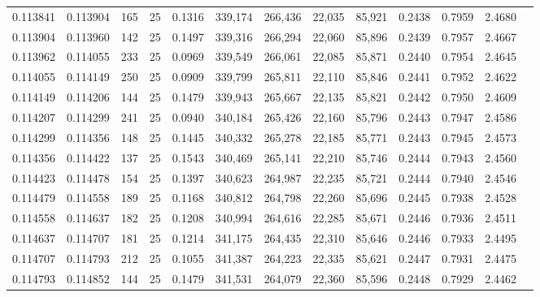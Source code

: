 \begin{tabular}{rrrrrrrrrrrrr}
0.113841 & 0.113904 &   165 &  25 &                                     0.1316 & 339,174 & 266,436 &  22,035 &  85,921 & 0.2438 & 0.7959 & 2.4680 \\
0.113904 & 0.113960 &   142 &  25 &                                     0.1497 & 339,316 & 266,294 &  22,060 &  85,896 & 0.2439 & 0.7957 & 2.4667 \\
0.113962 & 0.114055 &   233 &  25 &                                     0.0969 & 339,549 & 266,061 &  22,085 &  85,871 & 0.2440 & 0.7954 & 2.4645 \\
0.114055 & 0.114149 &   250 &  25 &                                     0.0909 & 339,799 & 265,811 &  22,110 &  85,846 & 0.2441 & 0.7952 & 2.4622 \\
0.114149 & 0.114206 &   144 &  25 &                                     0.1479 & 339,943 & 265,667 &  22,135 &  85,821 & 0.2442 & 0.7950 & 2.4609 \\
0.114207 & 0.114299 &   241 &  25 &                                     0.0940 & 340,184 & 265,426 &  22,160 &  85,796 & 0.2443 & 0.7947 & 2.4586 \\
0.114299 & 0.114356 &   148 &  25 &                                     0.1445 & 340,332 & 265,278 &  22,185 &  85,771 & 0.2443 & 0.7945 & 2.4573 \\
0.114356 & 0.114422 &   137 &  25 &                                     0.1543 & 340,469 & 265,141 &  22,210 &  85,746 & 0.2444 & 0.7943 & 2.4560 \\
0.114423 & 0.114478 &   154 &  25 &                                     0.1397 & 340,623 & 264,987 &  22,235 &  85,721 & 0.2444 & 0.7940 & 2.4546 \\
0.114479 & 0.114558 &   189 &  25 &                                     0.1168 & 340,812 & 264,798 &  22,260 &  85,696 & 0.2445 & 0.7938 & 2.4528 \\
0.114558 & 0.114637 &   182 &  25 &                                     0.1208 & 340,994 & 264,616 &  22,285 &  85,671 & 0.2446 & 0.7936 & 2.4511 \\
0.114637 & 0.114707 &   181 &  25 &                                     0.1214 & 341,175 & 264,435 &  22,310 &  85,646 & 0.2446 & 0.7933 & 2.4495 \\
0.114707 & 0.114793 &   212 &  25 &                                     0.1055 & 341,387 & 264,223 &  22,335 &  85,621 & 0.2447 & 0.7931 & 2.4475 \\
0.114793 & 0.114852 &   144 &  25 &                                     0.1479 & 341,531 & 264,079 &  22,360 &  85,596 & 0.2448 & 0.7929 & 2.4462 \\

\end{tabular}
